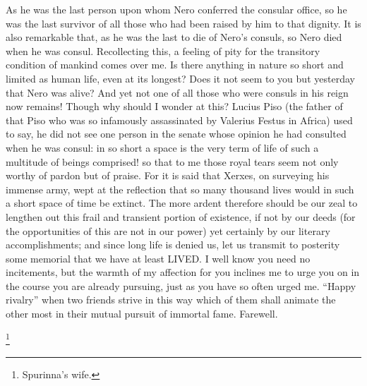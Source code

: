 As he was the last person upon whom Nero conferred the consular office, so
he was the last survivor of all those who had been raised by him to that
dignity. It is also remarkable that, as he was the last to die of Nero's
consuls, so Nero died when he was consul. Recollecting this, a feeling of
pity for the transitory condition of mankind comes over me. Is there
anything in nature so short and limited as human life, even at its
longest? Does it not seem to you but yesterday that Nero was alive? And
yet not one of all those who were consuls in his reign now remains! Though
why should I wonder at this? Lucius Piso (the father of that Piso who was
so infamously assassinated by Valerius Festus in Africa) used to say, he
did not see one person in the senate whose opinion he had consulted when
he was consul: in so short a space is the very term of life of such a
multitude of beings comprised! so that to me those royal tears seem not
only worthy of pardon but of praise. For it is said that Xerxes, on
surveying his immense army, wept at the reflection that so many thousand
lives would in such a short space of time be extinct. The more ardent
therefore should be our zeal to lengthen out this frail and transient
portion of existence, if not by our deeds (for the opportunities of this
are not in our power) yet certainly by our literary accomplishments; and
since long life is denied us, let us transmit to posterity some memorial
that we have at least LIVED. I well know you need no incitements, but the
warmth of my affection for you inclines me to urge you on in the course
you are already pursuing, just as you have so often urged me. ``Happy
rivalry'' when two friends strive in this way which of them shall animate
the other most in their mutual pursuit of immortal fame. Farewell.


\footnote{Spurinna's wife.}

